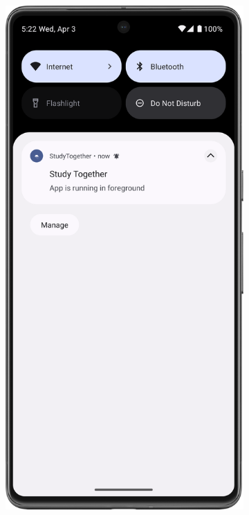 \begin{figure}[H]
  \begin{subfigure}[b]{0.5\textwidth}
    \includegraphics[width=\textwidth]{Figures/Product_Images/Notification/foreground_notification.png}

\end{subfigure}
\end{figure}

